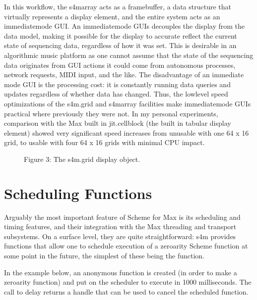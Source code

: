 \documentclass[letterpaper,10pt,english]{sphinxmanual}
\begin{document}
\sphinxAtStartPar
In this workflow, the s4m\sphinxhyphen{}array acts as a framebuffer,
a data structure that virtually represents a display element, and
the entire system acts as an immediate\sphinxhyphen{}mode GUI.
An immediate\sphinxhyphen{}mode GUIs decouples the display from the data model,
making it possible for the display to accurate reflect the current
state of sequencing data, regardless of how it was set.
This is desirable in an algorithmic music platform as one cannot
assume that the state of the sequencing data originates from
GUI actions \sphinxhyphen{} it could come from autonomous processes, network
requests, MIDI input, and the like.
The disadvantage of an immediate mode GUI is the processing cost:
it is constantly running data queries and updates regardless of whether
data has changed.
Thus, the low\sphinxhyphen{}level speed optimizations of the s4m.grid and s4m\sphinxhyphen{}array
facilities make immediate\sphinxhyphen{}mode GUIs practical where previously they were not.
In my personal experiments, comparison with the Max built in jit.cellblock
(the built in tabular display element) showed very significant speed
increases \sphinxhyphen{} from unusable with one 64 x 16 grid, to usable with
four 64 x 16 grids with minimal CPU impact.

\begin{figure}[htbp]
\centering
\capstart

\noindent{}
\caption{Figure 3: The s4m.grid display object.}\label{\detokenize{features_usage:id2}}\end{figure}


\section{Scheduling Functions}
\label{\detokenize{features_usage:scheduling-functions}}
\sphinxAtStartPar
Arguably the most important feature of Scheme for Max
is its scheduling and timing features, and their integration
with the Max threading and transport subsystems.
On a surface level, they are quite straightforward: s4m provides
functions that allow one to schedule execution of a zero\sphinxhyphen{}arity Scheme
function at some point in the future, the simplest of these being the
 function.

\sphinxAtStartPar
In the example below, an anonymous function is created (in order to make
a zero\sphinxhyphen{}arity function) and put on the scheduler
to execute in 1000 milliseconds. The call to delay returns a
handle that can be used to cancel the scheduled function.
\end{document}
